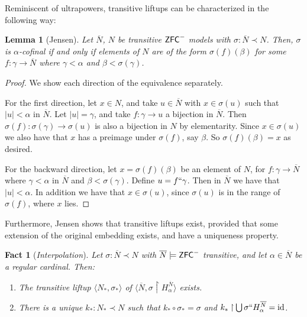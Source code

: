 \documentclass{amsart}
\newtheorem{lemma}[theorem]{Lemma}
\newtheorem{fact}[theorem]{Fact}
\theoremstyle{definition}
\theoremstyle{remark}
\newcommand{\N}{{\overline{N}}}
\newcommand{\ZFC}{\textup{\ensuremath{\textsf{ZFC}}}}
\newcommand{\id}{\textup{\ensuremath{\text{id}}}}
\newcommand{\rest}{\mathbin{\upharpoonright}}
\begin{document}
Reminiscent of ultrapowers, transitive liftups can be characterized in the following way:
\begin{lemma}[Jensen] \label{lemma:liftupchar} Let $\N$, $N$ be transitive $\ZFC^-$ models with $\sigma: \N \prec N$. Then,
$\sigma$ is $\alpha$-cofinal if and only if elements of $N$ are of the form $\sigma(f)(\beta)$ for some $f: \gamma \to \overline N$ where $\gamma < \alpha$ and $\beta < \sigma(\gamma)$. \end{lemma} 
\begin{proof} We show each direction of the equivalence separately.

For the first direction, let $x \in N$, and take $u \in \overline N$ with $x \in \sigma(u)$ such that $|u| <\alpha$ in $\overline N$. Let $|u|=\gamma$, and take $f:\gamma \to u$ a bijection in $\overline N$. Then $\sigma(f):\sigma(\gamma) \to \sigma(u)$ is also a bijection in $N$ by elementarity. Since $x \in \sigma(u)$ we also have that $x$ has a preimage under $\sigma(f)$, say $\beta$. So $\sigma(f)(\beta)=x$ as desired.

For the backward direction, let $x=\sigma(f)(\beta)$ be an element of $N$, for $f:\gamma \to \overline N$ where $\gamma < \alpha$ in $\overline N$ and $\beta < \sigma(\gamma)$. Define $u = f``\gamma$. Then in $\overline N$ we have that $|u|<\alpha$. In addition we have that $x \in \sigma(u)$, since $\sigma(u)$ is in the range of $\sigma(f)$, where $x$ lies.
\end{proof}

Furthermore, Jensen shows that transitive liftups exist, provided that some extension of the original embedding exists, and have a uniqueness property.

\begin{fact}[\emph{Interpolation}]\label{fact:Interpolation} Let $\sigma:\N \prec N$ with $\N \models \ZFC^-$ transitive, and let $\alpha \in \N$ be a regular cardinal. Then: \begin{enumerate}
	\item The transitive liftup $\langle N_*, \sigma_* \rangle$ of $\langle \N, \sigma \rest H^{\N}_\alpha \rangle$ exists.
	\item There is a unique $k_*:N_* \prec N$ such that $k_* \circ \sigma_* = \sigma$ and $k_* \rest \bigcup \sigma `` H^{\N}_\alpha = \id$.
\end{enumerate}
\end{fact} 
\end{document}
